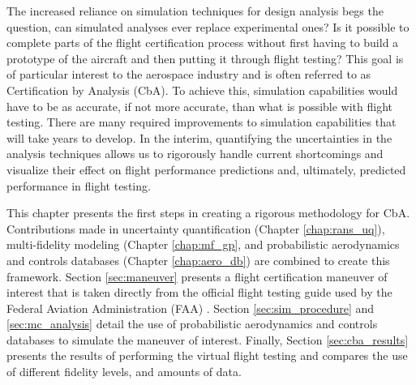 The increased reliance on simulation techniques for design analysis begs the question, can simulated analyses ever replace experimental ones?
Is it possible to complete parts of the flight certification process without first having to build a prototype of the aircraft and then putting it through flight testing?
This goal is of particular interest to the aerospace industry and is often referred to as Certification by Analysis (CbA).
To achieve this, simulation capabilities would have to be as accurate, if not more accurate, than what is possible with flight testing.  
There are many required improvements to simulation capabilities \cite{slotnick_cfd_nodate} that will take years to develop.
In the interim, quantifying the uncertainties in the analysis techniques allows us to rigorously handle current shortcomings and visualize their effect on flight performance predictions and, ultimately, predicted performance in flight testing.

This chapter presents the first steps in creating a rigorous methodology for CbA.
Contributions made in uncertainty quantification (Chapter \ref{chap:rans_uq}), multi-fidelity modeling (Chapter \ref{chap:mf_gp}, and probabilistic aerodynamics and controls databases (Chapter \ref{chap:aero_db}) are combined to create this framework.
Section \ref{sec:maneuver} presents a flight certification maneuver of interest that is taken directly from the official flight testing guide used by the Federal Aviation Administration (FAA) \cite{romanowski_flight_2018}.
Section \ref{sec:sim_procedure} and \ref{sec:mc_analysis} detail the use of probabilistic aerodynamics and controls databases to simulate the maneuver of interest.
Finally, Section \ref{sec:cba_results} presents the results of performing the virtual flight testing and compares the use of different fidelity levels, and amounts of data. 
 